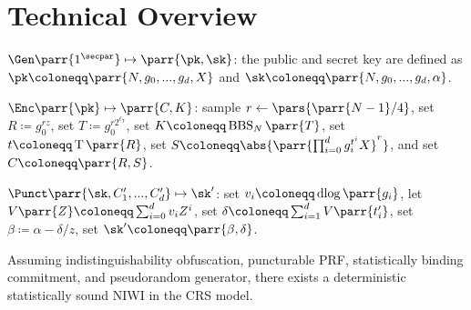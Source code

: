 \section{Technical Overview}
\label{sec:overview}

\begin{sitemize}
    \item \(\Gen\parr{1^\secpar} \mapsto \parr{\pk,\sk}\):
    the public and secret key are defined as \(\pk \coloneqq \parr{N, g_0, ..., g_d, X}\) and \(\sk \coloneqq \parr{N, g_0, ..., g_d, \alpha}\).
    
    \item \(\Enc\parr{\pk} \mapsto \parr{C,K}\):
    sample \(r \gets \pars{\parr{N-1}/4}\),
    set \(R \coloneqq g_0^{r z}\),
    set \(T \coloneqq g_0^{r 2^{\ell_{\mathsf{T}}}}\),
    set \(K \coloneqq \operatorname{BBS}_N\parr{T}\),
    set \(t \coloneqq \operatorname{T}\parr{R}\),
    set \(S \coloneqq \abs{\parr{\prod_{i=0}^d g_i^{t^i} X}^r}\),
    and set \(C \coloneqq \parr{R,S}\).
    \item \(\Punct\parr{\sk,C'_1,...,C'_d} \mapsto \sk'\):
    set \(v_i \coloneqq \operatorname{dlog}\parr{g_i}\),
    let \(V\parr{Z} \coloneqq \sum_{i=0}^d v_i Z^i\),
    set \(\delta \coloneqq \sum_{i=1}^d V\parr{t'_i}\),
    set \(\beta \coloneqq \alpha - \delta/z\),
    set \(\sk' \coloneqq \parr{\beta, \delta}\).
\end{sitemize}


\begin{theorem}
    Assuming indistinguishability obfuscation,
    puncturable PRF,
    statistically binding commitment,
    and pseudorandom generator,
    there exists a deterministic statistically sound NIWI in the CRS model.
\end{theorem}

